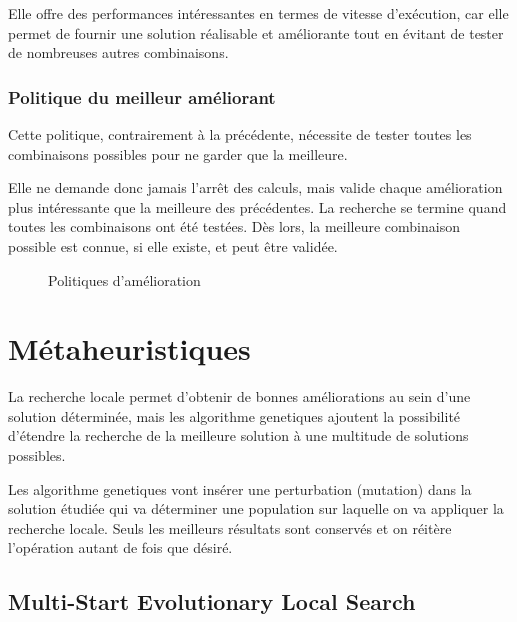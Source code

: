 				Elle offre des performances intéressantes en termes de vitesse d'exécution, car elle permet de fournir une solution réalisable et améliorante tout en évitant de tester de nombreuses autres combinaisons.

			\subsubsection{Politique du meilleur améliorant}
				\label{subs:best_available_policy}
				Cette politique, contrairement à la précédente, nécessite de tester toutes les combinaisons possibles pour ne garder que la meilleure. 

				Elle ne demande donc jamais l'arrêt des calculs, mais valide chaque amélioration plus intéressante que la meilleure des précédentes. La recherche se termine quand toutes les combinaisons ont été testées. Dès lors, la meilleure combinaison possible est connue, si elle existe, et peut être validée.

				\begin{figure}[h!]
					\centering
					\begin{tikzpicture}
						
					\end{tikzpicture}
					\caption[UML -- Politiques d'amélioration]{Politiques d'amélioration}
					\label{uml:available-policies}
				\end{figure}


	\section{Métaheuristiques}

		La recherche locale permet d'obtenir de bonnes améliorations au sein d'une solution déterminée, mais les \glspl{algorithme genetique} ajoutent la possibilité d'étendre la recherche de la meilleure solution à une multitude de solutions possibles.

		Les \glspl{algorithme genetique} vont insérer une perturbation (mutation) dans la solution étudiée qui va déterminer une population sur laquelle on va appliquer la recherche locale. Seuls les meilleurs résultats sont conservés et on réitère l'opération autant de fois que désiré.

		\subsection{Multi-Start Evolutionary Local Search}

